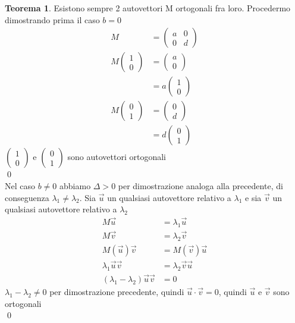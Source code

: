 \documentclass[10pt,a4paper]{article}
\theoremstyle{plain}
\theoremstyle{definition}
\newtheorem{teorema}[subsection]{Teorema}
\begin{document}
\begin{teorema}
	Esistono sempre 2 autovettori M ortogonali fra loro. Procedermo dimostrando prima il caso $b=0$
	\begin{align*}
		M&=\begin{pmatrix}
			a & 0 \\ 0 & d
		\end{pmatrix}\\
		M\begin{pmatrix}
			1 \\ 0
		\end{pmatrix}&=\begin{pmatrix}
			a \\ 0
		\end{pmatrix}
		\\
		&=a\begin{pmatrix}
		1 \\ 0
		\end{pmatrix}\\
		M\begin{pmatrix}
		0 \\ 1
		\end{pmatrix}&=\begin{pmatrix}
		0 \\ d
		\end{pmatrix}
		\\
		&=d\begin{pmatrix}
		0 \\ 1
		\end{pmatrix}
	\end{align*}
	$\begin{pmatrix}
		1 \\ 0
	\end{pmatrix}$ e $\begin{pmatrix}
		0 \\ 1
	\end{pmatrix}$ sono autovettori ortogonali\\
	\qed\\
	Nel caso $b\ne 0$ abbiamo $\Delta > 0$ per dimostrazione analoga alla precedente, di conseguenza $\lambda_1 \ne \lambda_2$. Sia $\vec{u}$ un qualsiasi autovettore relativo a $\lambda_1$ e sia $\vec{v}$ un qualsiasi autovettore relativo a $\lambda_2$
	\begin{align*}
		M\vec{u}&=\lambda_1 \vec{u} \\
		M\vec{v}&=\lambda_2 \vec{v} \\
		M(\vec{u})\vec{v}&=M(\vec{v})\vec{u} \\
		\lambda_1 \vec{u} \vec{v} &= \lambda_2 \vec{v}\vec{u} \\
		(\lambda_1 - \lambda_2)\vec{u}\vec{v} &=0
	\end{align*}
	$\lambda_1 - \lambda_2 \ne 0$ per dimostrazione precedente, quindi $\vec{u}\cdot\vec{v}=0$, quindi $\vec{u}$ e $\vec{v}$ sono ortogonali\\ \qed
\end{teorema}
\end{document}
